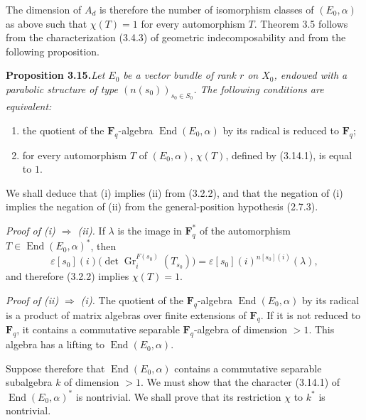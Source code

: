 \documentclass[11pt]{article}
\newcommand{\Fq}{\mathbf{F}_q}
\newcommand{\End}{\operatorname{End}}
\newcommand{\Gr}{\operatorname{Gr}}
\begin{document}
The dimension of \(A_d\) is therefore the number of isomorphism classes of \((E_0,\alpha)\) as above such that \(\chi(T)=1\) for every automorphism \(T\). Theorem 3.5 follows from the characterization (3.4.3) of geometric indecomposability and from the following proposition.

\noindent\textbf{Proposition 3.15.}\quad\textit{Let \(E_0\) be a vector bundle of rank \(r\) on \(X_0\), endowed with a parabolic structure of type \((n(s_0))_{s_0\in S_0}\). The following conditions are equivalent:}
\begin{enumerate}[label=(\roman*),leftmargin=2.5em]
\item the quotient of the \(\Fq\)-algebra \(\End(E_0,\alpha)\) by its radical is reduced to \(\Fq\);
\item for every automorphism \(T\) of \((E_0,\alpha)\), \(\chi(T)\), defined by (3.14.1), is equal to \(1\).
\end{enumerate}

We shall deduce that (i) implies (ii) from (3.2.2), and that the negation of (i) implies the negation of (ii) from the general-position hypothesis (2.7.3).

\textit{Proof of (i) \(\Rightarrow\) (ii).} If \(\lambda\) is the image in \(\Fq^*\) of the automorphism \(T\in\End(E_0,\alpha)^*\), then
\[
\varepsilon[s_0](i)\bigl(\det\Gr_i^{F(s_0)}(T_{s_0})\bigr)=\varepsilon[s_0](i)^{n[s_0](i)}(\lambda),
\]
and therefore (3.2.2) implies \(\chi(T)=1\).

\textit{Proof of (ii) \(\Rightarrow\) (i).} The quotient of the \(\Fq\)-algebra \(\End(E_0,\alpha)\) by its radical is a product of matrix algebras over finite extensions of \(\Fq\). If it is not reduced to \(\Fq\), it contains a commutative separable \(\Fq\)-algebra of dimension \(>1\). This algebra has a lifting to \(\End(E_0,\alpha)\).

Suppose therefore that \(\End(E_0,\alpha)\) contains a commutative separable subalgebra \(k\) of dimension \(>1\). We must show that the character (3.14.1) of \(\End(E_0,\alpha)^*\) is nontrivial. We shall prove that its restriction \(\chi\) to \(k^*\) is nontrivial.
\end{document}
